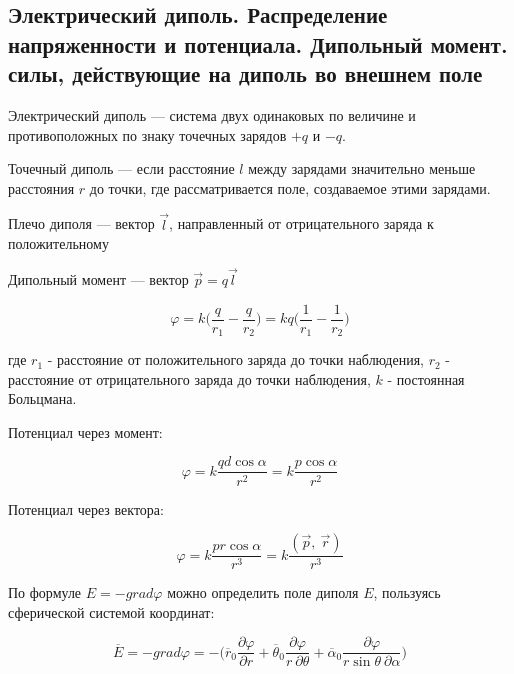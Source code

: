 \subsection{Электрический диполь. Распределение напряженности и потенциала. Дипольный момент. силы, действующие на диполь во внешнем поле}

\begin{definition}
    Электрический диполь — система двух одинаковых по величине и противоположных по знаку точечных зарядов $+q$ и $-q$. 
\end{definition}

\begin{definition}
    Точечный диполь — если расстояние $l$ между зарядами значительно меньше расстояния $r$ до точки, где рассматривается поле, создаваемое этими зарядами.
\end{definition}

\begin{definition}
    Плечо диполя — вектор $\vec l$, направленный от отрицательного заряда к положительному
\end{definition}

\begin{definition}
    Дипольный момент — вектор $\vec{p} = q\vec{l}$
\end{definition}

$$\varphi=k\bigg(\frac{q}{r_1}-\frac{q}{r_2}\bigg)=kq\bigg(\frac{1}{r_1}-\frac{1}{r_2}\bigg)$$

где $r_1$ - расстояние от положительного заряда до точки наблюдения,
$r_2$ - расстояние от отрицательного заряда до точки наблюдения,
$k$ - постоянная Больцмана.

\begin{remark}
    Потенциал через момент:

    $$\varphi=k\frac{qd\cos\alpha}{r^2}=k\frac{p\cos\alpha}{r^2}$$
\end{remark}

\begin{remark}
    Потенциал через вектора:

    $$\varphi=k\frac{pr\cos\alpha}{r^3}=k\frac{(\vec p,\ \vec r)}{r^3}$$
\end{remark}

По формуле $E=-grad\varphi$ можно определить поле диполя $E$, пользуясь сферической системой координат:

$$\overline E=-grad\varphi=-\bigg(\overline r_0\frac{\partial\varphi}{\partial r}+ \overline \theta_0\frac{\partial\varphi}{r\ \partial \theta}+\overline\alpha_0\frac{\partial\varphi}{r\sin\theta\ \partial\alpha} \bigg)$$

